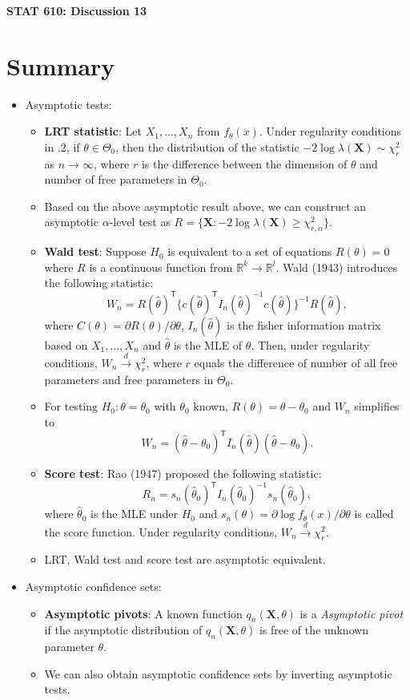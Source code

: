 \documentclass[12pt]{extarticle}
\newcommand{\X}{\mathbf X}
\newcommand{\T}{^\mathsf{T}}
\begin{document}
\begin{center}
{\large \bf STAT 610: Discussion 13}
\end{center}
\vspace{0.22cm}

\section{Summary}
\begin{itemize}
	\item Asymptotic tests: 
	\begin{itemize}
		\item \textbf{LRT statistic}: Let $X_1,\ldots, X_n$ from $f_\theta(x)$. Under regularity conditions in .2, if $\theta\in\Theta_0$, then the distribution of the statistic $-2\log\lambda(\X)\sim \chi^2_r$ as $n\rightarrow\infty$, where $r$ is the difference between the dimension of $\theta$ and number of free parameters in $\Theta_0$. 
		\item Based on the above asymptotic result above, we can construct an asymptotic $\alpha$-level test as $R = \{\X: -2\log\lambda(\X)\geq \chi^2_{r,\alpha}\}$.
		\item \textbf{Wald test}: Suppose $H_0$ is equivalent to a set of equations $R(\theta) = 0$ where $R$ is a continuous function from $\mathbb R^k\rightarrow \mathbb R^l$. Wald (1943) introduces the following statistic:
		$$W_n = R(\hat\theta)\T\{c(\hat\theta)\T I_n(\hat\theta)^{-1}c(\hat\theta)\}^{-1}R(\hat\theta),$$
		where $C(\theta) = \partial R(\theta)/\partial\theta$, $I_n(\hat\theta)$ is the fisher information matrix based on $X_1,\ldots,X_n$ and $\hat\theta$ is the MLE of $\theta$. Then, under regularity conditions, $W_n\xrightarrow{d}\chi^2_r$, where $r$ equals the difference of number of all free parameters and free parameters in $\Theta_0$.
		\item For testing $H_0:\theta = \theta_0$ with $\theta_0$ known, $R(\theta) = \theta - \theta_0$ and $W_n$ simplifies to $$W_n = (\hat \theta - \theta_0)\T I_n(\hat\theta)(\hat \theta - \theta_0).$$
		\item \textbf{Score test}: Rao (1947) proposed the following statistic:
		$$R_n = s_n(\hat\theta_0)\T I_n(\hat\theta_0)^{-1}s_n(\hat\theta_0),$$
		where $\hat\theta_0$ is the MLE under $H_0$ and $s_n(\theta) = \partial\log f_\theta(x)/\partial\theta$ is called the score function. Under regularity conditions, $W_n\xrightarrow{d}\chi^2_r$.
		\item LRT, Wald test and score test are asymptotic equivalent.
	\end{itemize}
	\item Asymptotic confidence sets: 
	\begin{itemize}
		\item \textbf{Asymptotic pivots}: A known function $q_n(\X, \theta)$ is a \textit{Asymptotic pivot} if the asymptotic distribution of $q_n(\X, \theta)$ is free of the unknown parameter $\theta$.
		\item We can also obtain asymptotic confidence sets by inverting asymptotic tests.
	\end{itemize}
\end{itemize}
\end{document}
